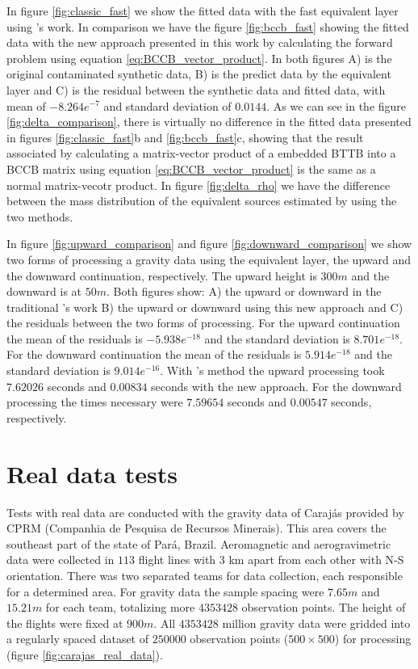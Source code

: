 \documentclass[paper]{geophysics}
\begin{document}
In figure \ref{fig:classic_fast} we show the fitted data with the fast equivalent layer using \cite{siqueira2017fast}'s work. In comparison we have the figure \ref{fig:bccb_fast} showing the fitted data with the new approach presented in this work by calculating the forward problem using equation \ref{eq:BCCB_vector_product}. In both figures A) is the original contaminated synthetic data, B) is the predict data by the equivalent layer and C) is the residual between the synthetic data and fitted data, with mean of $-8.264e^{-7}$ and standard deviation of $0.0144$. As we can see in the figure \ref{fig:delta_comparison}, there is virtually no difference in the fitted data presented in figures \ref{fig:classic_fast}b and \ref{fig:bccb_fast}c, showing that the result associated by calculating a matrix-vector product of a embedded BTTB into a BCCB matrix using equation \ref{eq:BCCB_vector_product} is the same as a normal matrix-vecotr product. In figure \ref{fig:delta_rho} we have the difference between the mass distribution of the equivalent sources estimated by using the two methods. 

In figure \ref{fig:upward_comparison} and figure \ref{fig:downward_comparison} we show two forms of processing a gravity data using the equivalent layer, the upward and the downward continuation, respectively. The upward height is $300 m$ and the downward is at $50 m$. Both figures show: A) the upward or downward in the traditional \cite{siqueira2017fast}'s work B) the upward or downward using this new approach and C) the residuals between the two forms of processing. For the upward continuation the mean of the residuals is $-5.938e^{-18}$ and the standard deviation is $8.701e^{-18}$. For the downward continuation the mean of the residuals is $5.914e^{-18}$ and the standard deviation is $9.014e^{-16}$. With \cite{siqueira2017fast}'s method the upward processing took $7.62026$ seconds and $0.00834$ seconds with the new approach. For the downward processing the times necessary were $7.59654$ seconds and $0.00547$ seconds, respectively.

\section{Real data tests}
Tests with real data are conducted with the gravity data of Caraj\'as provided by CPRM (Companhia de Pesquisa de Recursos Minerais). This area covers the southeast part of the state of Par\'a, Brazil. Aeromagnetic and aerogravimetric data were collected in $113$ flight lines with $3$ km apart from each other with N-S orientation. There was two separated teams for data collection, each responsible for a determined area. For gravity data the sample spacing were $7.65 m$ and $15.21 m$ for each team, totalizing more $4353428$ observation points. The height of the flights were fixed at $900 m$. All $4353428$ million gravity data were gridded into a regularly spaced dataset of $250000$ observation points ($500 \times 500$) for processing (figure \ref{fig:carajas_real_data}).
\end{document}
